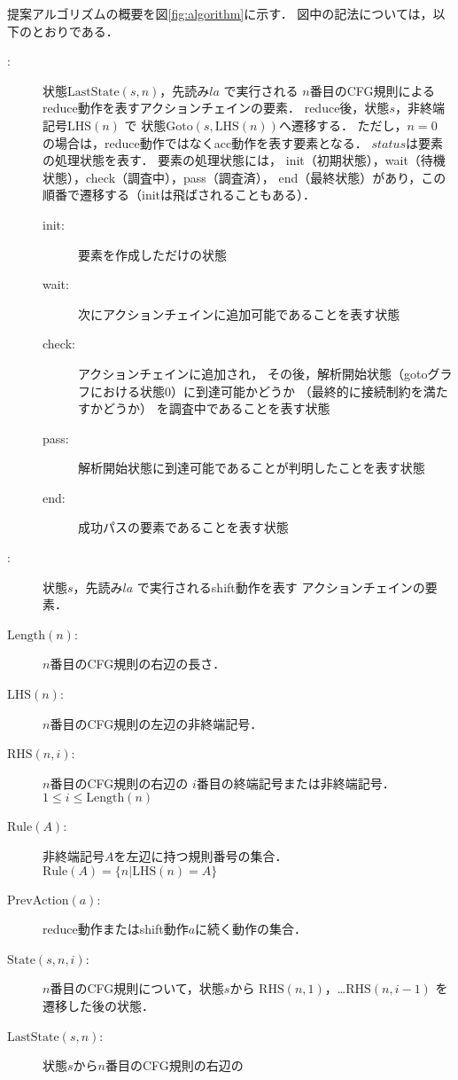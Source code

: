 \documentclass[japanese]{jnlp_1.4}
\begin{document}
提案アルゴリズムの概要を図\ref{fig:algorithm}に示す．
図中の記法については，以下のとおりである．
\begin{description}
\item[:]
  状態$\mathrm{LastState}(s,n)$，先読み$\mathit{la}$ で実行される
  $n$番目のCFG規則によるreduce動作を表すアクションチェインの要素．
  reduce後，状態$s$，非終端記号$\mathrm{LHS}(n)$ で
  状態$\mathrm{Goto}(s,\mathrm{LHS}(n))$へ遷移する．
  ただし，$n=0$ の場合は，reduce動作ではなくacc動作を表す要素となる．
  $\mathit{status}$は要素の処理状態を表す．
  要素の処理状態には，
  init（初期状態），wait（待機状態），check（調査中），pass（調査済），
  end（最終状態）があり，この順番で遷移する（initは飛ばされることもある）．
  \begin{description}
  \item[init:] 要素を作成しただけの状態
  \item[wait:] 次にアクションチェインに追加可能であることを表す状態
  \item[check:] アクションチェインに追加され，
    その後，解析開始状態（gotoグラフにおける状態0）に到達可能かどうか
（最終的に接続制約を満たすかどうか） を調査中であることを表す状態
  \item[pass:] 解析開始状態に到達可能であることが判明したことを表す状態
  \item[end:] 成功パスの要素であることを表す状態
  \end{description}
\item[:]
  状態$s$，先読み$\mathit{la}$ で実行されるshift動作を表す
  アクションチェインの要素．
\item[$\mathrm{Length}(n)$:] $n$番目のCFG規則の右辺の長さ．
\item[$\mathrm{LHS}(n)$:] $n$番目のCFG規則の左辺の非終端記号．
\item[$\mathrm{RHS}(n,i)$:] $n$番目のCFG規則の右辺の
  $i$番目の終端記号または非終端記号．$1\leq i\leq\mathrm{Length}(n)$
\item[$\mathrm{Rule}(\mathit{A})$:] 非終端記号$A$を左辺に持つ規則番号の集合．
  $\mathrm{Rule}(\mathit{A})=\{n|\mathrm{LHS}(n)=A\}$
\item[$\mathrm{PrevAction}(a)$:] 
  reduce動作またはshift動作$a$に続く動作の集合．
\item[$\mathrm{State}(s,n,i)$:] 
  $n$番目のCFG規則について，状態$s$から
  $\mathrm{RHS}(n,1)$，…$\mathrm{RHS}(n,i-1)$ を遷移した後の状態．
\item[$\mathrm{LastState}(s,n)$:] 状態$s$から$n$番目のCFG規則の右辺の

\end{description}
\end{document}
